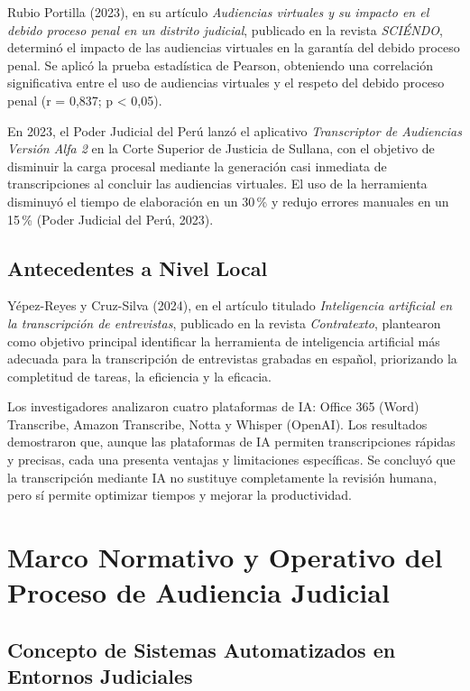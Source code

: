 \documentclass[12pt,a4paper,oneside]{report}
\begin{document}
Rubio Portilla (2023), en su artículo \textit{Audiencias virtuales y su impacto en el debido proceso penal en un distrito judicial}, publicado en la revista \textit{SCIÉNDO}, determinó el impacto de las audiencias virtuales en la garantía del debido proceso penal. Se aplicó la prueba estadística de Pearson, obteniendo una correlación significativa entre el uso de audiencias virtuales y el respeto del debido proceso penal (r = 0,837; p < 0,05).

En 2023, el Poder Judicial del Perú lanzó el aplicativo \textit{Transcriptor de Audiencias Versión Alfa 2} en la Corte Superior de Justicia de Sullana, con el objetivo de disminuir la carga procesal mediante la generación casi inmediata de transcripciones al concluir las audiencias virtuales. El uso de la herramienta disminuyó el tiempo de elaboración en un 30\,\% y redujo errores manuales en un 15\,\% (Poder Judicial del Perú, 2023).

\subsection{Antecedentes a Nivel Local}

Yépez-Reyes y Cruz-Silva (2024), en el artículo titulado \textit{Inteligencia artificial en la transcripción de entrevistas}, publicado en la revista \textit{Contratexto}, plantearon como objetivo principal identificar la herramienta de inteligencia artificial más adecuada para la transcripción de entrevistas grabadas en español, priorizando la completitud de tareas, la eficiencia y la eficacia.

Los investigadores analizaron cuatro plataformas de IA: Office 365 (Word) Transcribe, Amazon Transcribe, Notta y Whisper (OpenAI). Los resultados demostraron que, aunque las plataformas de IA permiten transcripciones rápidas y precisas, cada una presenta ventajas y limitaciones específicas. Se concluyó que la transcripción mediante IA no sustituye completamente la revisión humana, pero sí permite optimizar tiempos y mejorar la productividad.

\section{Marco Normativo y Operativo del Proceso de Audiencia Judicial}

\subsection{Concepto de Sistemas Automatizados en Entornos Judiciales}
\end{document}
